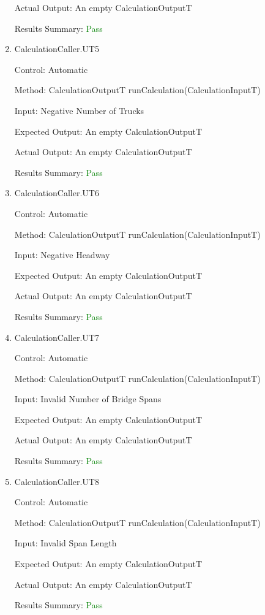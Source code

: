 \documentclass[12pt, titlepage]{article}
\begin{document}
\begin{enumerate}
  Actual Output: An empty CalculationOutputT

  Results Summary: \textcolor{green} {Pass}
  
  \item {CalculationCaller.UT5}

  Control: Automatic

  Method: CalculationOutputT runCalculation(CalculationInputT)

  Input: Negative Number of Trucks

  Expected Output: An empty CalculationOutputT

  Actual Output: An empty CalculationOutputT

  Results Summary: \textcolor{green} {Pass}

  \item {CalculationCaller.UT6}

  Control: Automatic

  Method: CalculationOutputT runCalculation(CalculationInputT)

  Input: Negative Headway

  Expected Output: An empty CalculationOutputT

  Actual Output: An empty CalculationOutputT

  Results Summary: \textcolor{green} {Pass}

  \item {CalculationCaller.UT7}

  Control: Automatic

  Method: CalculationOutputT runCalculation(CalculationInputT)

  Input: Invalid Number of Bridge Spans

  Expected Output: An empty CalculationOutputT

  Actual Output: An empty CalculationOutputT

  Results Summary: \textcolor{green} {Pass}

  \item {CalculationCaller.UT8}

  Control: Automatic

  Method: CalculationOutputT runCalculation(CalculationInputT)

  Input: Invalid Span Length

  Expected Output: An empty CalculationOutputT

  Actual Output: An empty CalculationOutputT

  Results Summary: \textcolor{green} {Pass}


\end{enumerate}
\end{document}
